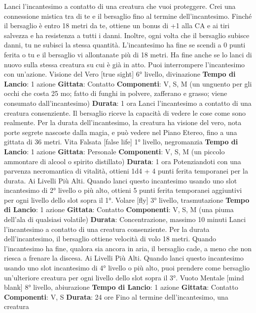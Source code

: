 \begin{multicols}{2}
Lanci l’incantesimo a contatto di una creatura che vuoi
proteggere. Crei una connessione mistica tra di te e il
bersaglio fino al termine dell’incantesimo. Finché il
bersaglio è entro 18 metri da te, ottiene un bonus di +1
alla CA e ai tiri salvezza e ha resistenza a tutti i danni.
Inoltre, ogni volta che il bersaglio subisce danni, tu ne
subisci la stessa quantità.
L’incantesimo ha fine se scendi a 0 punti ferita o tu e il
bersaglio vi allontanate più di 18 metri. Ha fine anche
se lo lanci di nuovo sulla stessa creatura su cui è già in
atto. Puoi interrompere l’incantesimo con un’azione.
Visione del Vero
[true sight]
6° livello, divinazione
\textbf{Tempo di Lancio}: 1 azione
\textbf{Gittata}: Contatto
\textbf{Componenti}: V, S, M (un unguento per gli occhi che
costa 25 mo; fatto di funghi in polvere, zafferano e
grasso; viene consumato dall’incantesimo)
\textbf{Durata}: 1 ora
Lanci l’incantesimo a contatto di una creatura
consenziente. Il bersaglio riceve la capacità di vedere le
cose come sono realmente. Per la durata
dell’incantesimo, la creatura ha visione del vero, nota
porte segrete nascoste dalla magia, e può vedere nel
Piano Etereo, fino a una gittata di 36 metri.
Vita Falsata
[false life]
1° livello, negromanzia
\textbf{Tempo di Lancio}: 1 azione
\textbf{Gittata}: Personale
\textbf{Componenti}: V, S, M (un piccolo ammontare di alcool
o spirito distillato)
\textbf{Durata}: 1 ora
Potenziandoti con una parvenza necromantica di
vitalità, ottieni 1d4 + 4 punti ferita temporanei per la
durata.
Ai Livelli Più Alti. Quando lanci questo incantesimo
usando uno slot incantesimo di 2° livello o più alto,
ottieni 5 punti ferita temporanei aggiuntivi per ogni
livello dello slot sopra il 1°.
Volare
[fly]
3° livello, trasmutazione
\textbf{Tempo di Lancio}: 1 azione
\textbf{Gittata}: Contatto
\textbf{Componenti}: V, S, M (una piuma dell’ala di qualsiasi
volatile)
\textbf{Durata}: Concentrazione, massimo 10 minuti
Lanci l’incantesimo a contatto di una creatura
consenziente. Per la durata dell’incantesimo, il
bersaglio ottiene velocità di volo 18 metri. Quando
l’incantesimo ha fine, qualora sia ancora in aria, il
bersaglio cade, a meno che non riesca a frenare la
discesa.
Ai Livelli Più Alti. Quando lanci questo incantesimo
usando uno slot incantesimo di 4° livello o più alto, puoi
prendere come bersaglio un’ulteriore creatura per ogni
livello dello slot sopra il 3°.
Vuoto Mentale
[mind blank]
8° livello, abiurazione
\textbf{Tempo di Lancio}: 1 azione
\textbf{Gittata}: Contatto
\textbf{Componenti}: V, S
\textbf{Durata}: 24 ore
Fino al termine dell’incantesimo, una creatura

\end{multicols}
